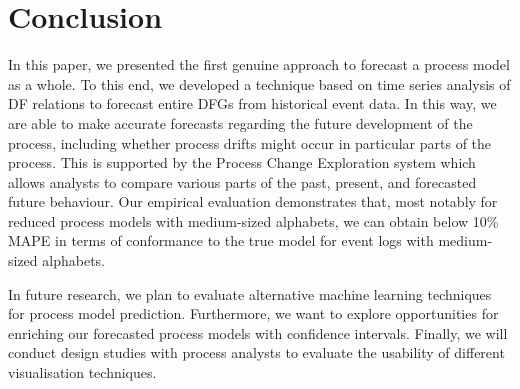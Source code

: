 \section{Conclusion}\label{sec:conclusion}
In this paper, we presented the first genuine approach to forecast a process model as a whole. To this end, we developed a
technique based on time series analysis of DF relations to forecast entire DFGs from historical event data. 
In this way, we are able to make accurate forecasts regarding the future development of the process, including whether process drifts might occur in particular parts of the process. 
This is supported by the Process Change Exploration system which allows analysts to compare various parts of the past, present, and forecasted future behaviour.
Our empirical evaluation demonstrates that, most notably for reduced process models with medium-sized alphabets, we can obtain below 10\% MAPE in terms of conformance to the true model for event logs with medium-sized alphabets. 

In future research, we plan to evaluate alternative machine learning techniques for process model prediction. Furthermore, we want to explore opportunities for enriching our forecasted process models with confidence intervals. Finally, we will conduct design studies with process analysts to evaluate the usability of different visualisation techniques.
